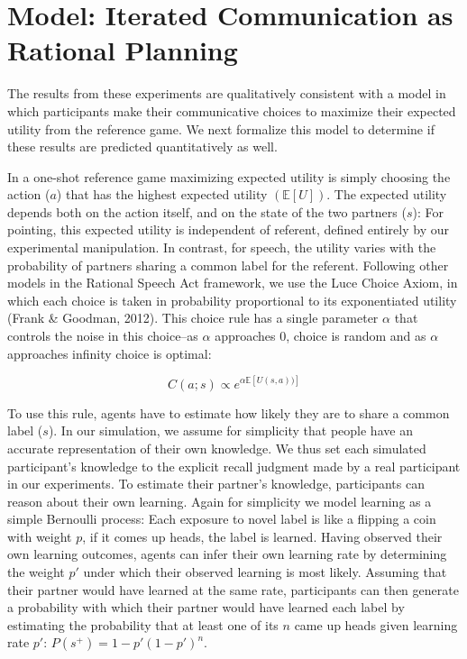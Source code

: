 \documentclass[10pt, letterpaper]{article}
\begin{document}
\section{Model: Iterated Communication as Rational
Planning}\label{model-iterated-communication-as-rational-planning}

The results from these experiments are qualitatively consistent with a
model in which participants make their communicative choices to maximize
their expected utility from the reference game. We next formalize this
model to determine if these results are predicted quantitatively as
well.

\newcommand{\E}[1]{\mathbb{E}\left[ #1 \right]}

In a one-shot reference game maximizing expected utility is simply
choosing the action (\(a\)) that has the highest expected utility
\((\E{U})\). The expected utility depends both on the action itself, and
on the state of the two partners (\(s\)): For pointing, this expected
utility is independent of referent, defined entirely by our experimental
manipulation. In contrast, for speech, the utility varies with the
probability of partners sharing a common label for the referent.
Following other models in the Rational Speech Act framework, we use the
Luce Choice Axiom, in which each choice is taken in probability
proportional to its exponentiated utility (Frank \& Goodman, 2012). This
choice rule has a single parameter \(\alpha\) that controls the noise in
this choice--as \(\alpha\) approaches 0, choice is random and as
\(\alpha\) approaches infinity choice is optimal:

\[ 
C\left(a;s\right) \propto e^{\alpha \E{U \left(s,a\right))}}
\]

To use this rule, agents have to estimate how likely they are to share a
common label (\(s\)). In our simulation, we assume for simplicity that
people have an accurate representation of their own knowledge. We thus
set each simulated participant's knowledge to the explicit recall
judgment made by a real participant in our experiments. To estimate
their partner's knowledge, participants can reason about their own
learning. Again for simplicity we model learning as a simple Bernoulli
process: Each exposure to novel label is like a flipping a coin with
weight \(p\), if it comes up heads, the label is learned. Having
observed their own learning outcomes, agents can infer their own
learning rate by determining the weight \(p'\) under which their
observed learning is most likely. Assuming that their partner would have
learned at the same rate, participants can then generate a probability
with which their partner would have learned each label by estimating the
probability that at least one of its \(n\) came up heads given learning
rate \(p'\): \(P\left(s^{+}\right)=1-p'\left( 1-p' \right)^{n}\).
\end{document}
